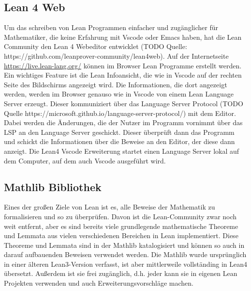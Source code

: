 \documentclass[10pt]{article}
\begin{document}
\subsection{Lean 4 Web}
Um das schreiben von Lean Programmen einfacher und zugänglicher für Mathematiker, die keine Erfahrung mit Vscode oder Emacs haben, hat die Lean Community den Lean 4 Webeditor entwicklet (TODO Quelle: https://github.com/leanprover-community/lean4web). Auf der Internetseite \href{https://live.lean-lang.org/}{https://live.lean-lang.org/} können im Browser Lean Programme erstellt werden. Ein wichtiges Feature ist die Lean Infoansicht, die wie in Vscode auf der rechten Seite des Bildschirms angezeigt wird. Die Informationen, die dort angezeigt werden, werden im Browser genauso wie in Vscode von einem Lean Language Server erzeugt. Dieser kommuniziert über das Language Server Protocol (TODO Quelle https://microsoft.github.io/language-server-protocol/) mit dem Editor. Dabei werden die Änderungen, die der Nutzer im Programm vornimmt über das LSP an den Language Server geschickt. Dieser überprüft dann das Programm und schickt die Informationen über die Beweise an den Editor, der diese dann anzeigt. Die Lean4 Vscode Erweiterung startet einen Language Server lokal auf dem Computer, auf dem auch Vscode ausgeführt wird.  

\subsection{Mathlib Bibliothek}
Eines der großen Ziele von Lean ist es, alle Beweise der Mathematik zu formalisieren und so zu überprüfen. Davon ist die Lean-Community zwar noch weit entfernt, aber es sind bereits viele grundlegende mathematische Theoreme und Lemmata aus vielen verschiedenen Bereichen in Lean implementiert. Diese Theoreme und Lemmata sind in der Mathlib \cite{Q10} katalogisiert und können so auch in darauf aufbauenden Beweisen verwendet werden. Die Mathlib wurde ursprünglich in einer älteren Lean3-Version verfasst, ist aber mittlerweile vollständing in Lean4 übersetzt. Außerdem ist sie frei zugänglich, d.h. jeder kann sie in eigenen Lean Projekten verwenden und auch Erweiterungsvorschläge machen. 
\end{document}

